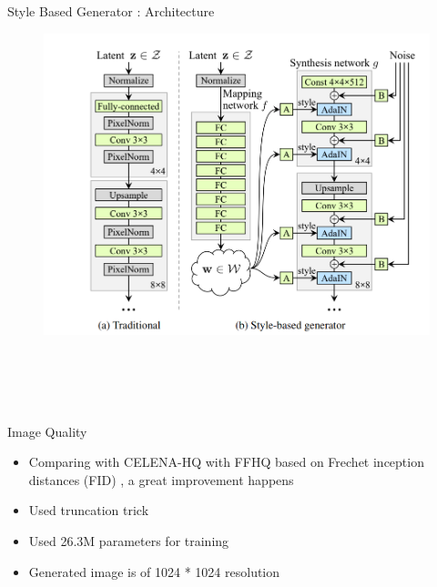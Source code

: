 \documentclass[10pt]{beamer}
\begin{document}
\begin{frame}[fragile]{Style Based Generator : Architecture}
     \begin{figure}[ht]
         \hspace*{-1cm}\includegraphics[width=0.9\linewidth]{styleganarchitecture.png} \\ \\ \\ \\ \\
    \end{figure}
\end{frame}

\begin{frame}[fragile]{Image Quality }
        \begin{itemize}
        \item Comparing with CELENA-HQ with FFHQ based on Frechet inception distances (FID) , a great improvement happens
        \item Used truncation trick
        \item Used 26.3M parameters for training
        \item Generated image is of 1024 * 1024 resolution
    \end{itemize}

\end{frame}

\end{document}
